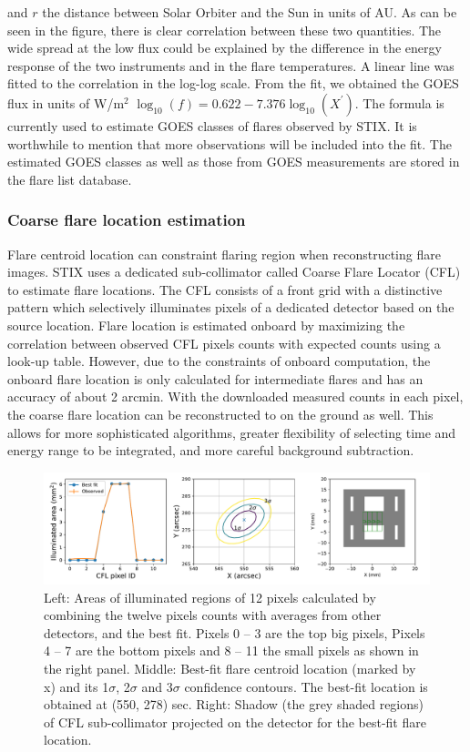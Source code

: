 \documentclass{aa}
\begin{document}
 and $r$ the distance between Solar Orbiter and the Sun in units of AU. 
As can be seen in the figure, there is clear correlation between
these two quantities.  The wide spread at the low flux could be explained by the difference in 
the energy response of the two instruments and in the flare temperatures. 
A linear line was fitted to the  correlation in the log-log scale. 
From the fit, we obtained 
the GOES flux in units of W/m$^2$ $\log_{10}(f) = 0.622 -7.376 \log_{10} (X^{'})$.
The formula is currently used to estimate GOES classes  of flares observed by STIX. 
It is  worthwhile to mention that more observations will be included into the fit.
The estimated GOES classes as well as those from GOES measurements 
are stored in the flare list database. 

\subsubsection{Coarse flare location estimation}
Flare centroid location can constraint flaring region when reconstructing flare images.
STIX uses a dedicated sub-collimator called Coarse Flare Locator (CFL) to estimate flare locations.
The CFL consists of a front grid with
a distinctive pattern which selectively illuminates pixels of a 
dedicated detector based on the source location.
Flare location is estimated onboard by maximizing the correlation between observed CFL pixels counts 
with expected counts using a look-up table. 
However, due to the constraints of onboard computation, the onboard flare location is  only calculated for intermediate flares 
and has an accuracy of about 2 arcmin. 
With the downloaded measured counts  in each pixel,
the coarse flare location can be reconstructed to on the ground as well. 
This allows for more sophisticated algorithms, greater flexibility of selecting time and energy 
range to be integrated, and more careful background subtraction.

\begin{figure}
  \centering
  \includegraphics[width=0.95\linewidth]{figures/cflMay07.pdf}
  \caption{
   Left: Areas of illuminated regions of 12 pixels calculated by combining
  the twelve pixels counts with averages from other detectors, and the best fit. 
  Pixels 0 -- 3 are the top big pixels, Pixels 4 -- 7 are the bottom pixels and 8 -- 11 the small pixels as shown in the right panel.
   Middle: Best-fit flare centroid location (marked by x) and its 1$\sigma$, 2$\sigma$ and 3$\sigma$ confidence contours.
   The best-fit location is obtained at (550, 278) sec. 
    Right:  Shadow (the grey shaded regions) of CFL sub-collimator projected on the detector 
  for the best-fit flare location. }
  \label{fig:cfl}
\end{figure}
\end{document}
